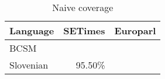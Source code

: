 \begin{table}
\begin{tabular}{lrr}

\textbf{Language} & \textbf{SETimes} & \textbf{Europarl}\\
\hline
BCSM &  &  \\
Slovenian & 95.50\% & \\
\hline
\end{tabular}
\caption{ Naive coverage }
\label{table:coverage}
\end{table}

